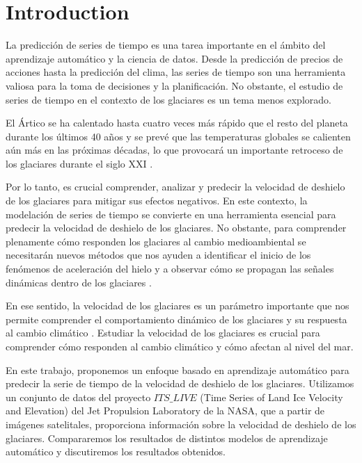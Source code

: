 \documentclass[sigconf,language=spanish]{acmart}
\begin{document}

\maketitle

\section{Introduction}


La predicción de series de tiempo es una tarea importante en el
ámbito del aprendizaje automático y la ciencia de datos. Desde la
predicción de precios de acciones hasta la predicción del clima, las
series de tiempo son una herramienta valiosa para la toma de decisiones
y la planificación. No obstante, el estudio de series de tiempo en el contexto de los glaciares es un tema menos explorado.

El Ártico se ha calentado hasta cuatro veces más rápido que el resto del planeta durante los últimos 40 años 
y se prevé que las temperaturas globales se calienten aún más en las próximas décadas, 
lo que provocará un importante retroceso de los glaciares durante el siglo XXI \cite{kavan_new_2025}.

Por lo tanto, es crucial comprender, analizar y predecir la velocidad de deshielo de los glaciares para mitigar sus efectos negativos.
En este contexto, la modelación de series de tiempo se convierte en una herramienta esencial para predecir la velocidad de deshielo de los glaciares.
No obstante, para comprender plenamente cómo responden los glaciares al cambio medioambiental 
se necesitarán nuevos métodos que nos ayuden a identificar el inicio de los fenómenos de aceleración del hielo y a observar cómo se propagan las señales dinámicas dentro de los glaciares \cite{greene_detecting_2020}.

En ese sentido, la velocidad de los glaciares es un parámetro importante que nos permite comprender
el comportamiento dinámico de los glaciares y su respuesta al cambio climático \cite{zhang_validation_2024}.
Estudiar la velocidad de los glaciares es crucial para comprender cómo responden al cambio climático y cómo afectan al nivel del mar.

En este trabajo, proponemos un enfoque basado en aprendizaje automático para predecir la serie de tiempo de la velocidad de deshielo de los glaciares.
Utilizamos un conjunto de datos del proyecto  $ITS\_LIVE$ (Time Series of Land Ice Velocity and Elevation) del Jet Propulsion Laboratory de la NASA, que a partir de imágenes satelitales, proporciona información sobre la velocidad de deshielo de los glaciares.
Compararemos los resultados de distintos modelos de aprendizaje automático y discutiremos los resultados obtenidos.
\end{document}
